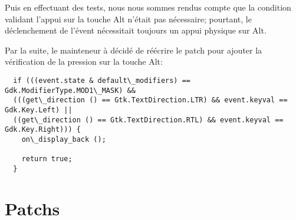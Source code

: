 \documentclass[12pt]{report}
\begin{document}
Puis en effectuant des tests, nous nous sommes rendus compte que la
condition validant l'appui sur la touche Alt n'était pas nécessaire;
pourtant, le déclenchement de l'évent nécessitait toujours un appui
physique sur Alt.

Par la suite, le mainteneur à décidé de réécrire le patch pour ajouter
la vérification de la pression sur la touche Alt:

\begin{verbatim}
  if (((event.state & default\_modifiers) == Gdk.ModifierType.MOD1\_MASK) &&
  (((get\_direction () == Gtk.TextDirection.LTR) && event.keyval == Gdk.Key.Left) ||
  ((get\_direction () == Gtk.TextDirection.RTL) && event.keyval == Gdk.Key.Right))) {
    on\_display_back ();

    return true;
  }
\end{verbatim}




\appendix






\chapter{Patchs} 
\end{document}
